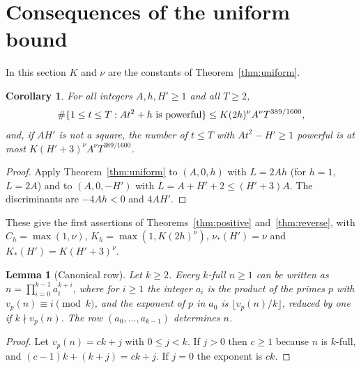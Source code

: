 \documentclass[11pt,reqno]{amsart}
\newtheorem{lemma}[theorem]{Lemma}
\newtheorem{corollary}[theorem]{Corollary}
\theoremstyle{definition}
\theoremstyle{remark}
\numberwithin{equation}{section}
\begin{document}
\section{Consequences of the uniform bound}\label{sec:consequences}
In this section $K$ and $\nu$ are the constants of Theorem~\ref{thm:uniform}.

\begin{corollary}\label{cor:shift}
For all integers $A,h,H'\ge1$ and all $T\ge2$,
\[
 \#\{1\le t\le T:At^2+h\textnormal{ is powerful}\}\le K(2h)^{\nu}A^{\nu}T^{389/1600},
\]
and, if $AH'$ is not a square, the number of $t\le T$ with $At^2-H'\ge1$
powerful is at most $K(H'+3)^{\nu}A^{\nu}T^{389/1600}$.
\end{corollary}
\begin{proof}
Apply Theorem~\ref{thm:uniform} to $(A,0,h)$ with $L=2Ah$ (for $h=1$, $L=2A$) and to
$(A,0,-H')$ with $L=A+H'+2\le(H'+3)A$. The discriminants are $-4Ah<0$ and
$4AH'$.
\end{proof}
These give the first assertions of Theorems~\ref{thm:positive} and~\ref{thm:reverse}, with
$C_h=\max(1,\nu)$, $K_h=\max(1,K(2h)^{\nu})$,
$\nu_*(H')=\nu$ and $K_*(H')=K(H'+3)^{\nu}$.

\begin{lemma}[Canonical row]\label{lem:row}
Let $k\ge2$. Every $k$-full $n\ge1$ can be written as
$n=\prod_{i=0}^{k-1}a_i^{k+i}$, where for $i\ge1$ the integer $a_i$ is the
product of the primes $p$ with $v_p(n)\equiv i\pmod k$, and the exponent of
$p$ in $a_0$ is $\lfloor v_p(n)/k\rfloor$, reduced by one if $k\nmid
v_p(n)$. The row $(a_0,\dots,a_{k-1})$ determines $n$.
\end{lemma}
\begin{proof}
Let $v_p(n)=ck+j$ with $0\le j<k$. If $j>0$ then $c\ge1$ because $n$ is
$k$-full, and $(c-1)k+(k+j)=ck+j$. If $j=0$ the exponent is $ck$.
\end{proof}
\end{document}

